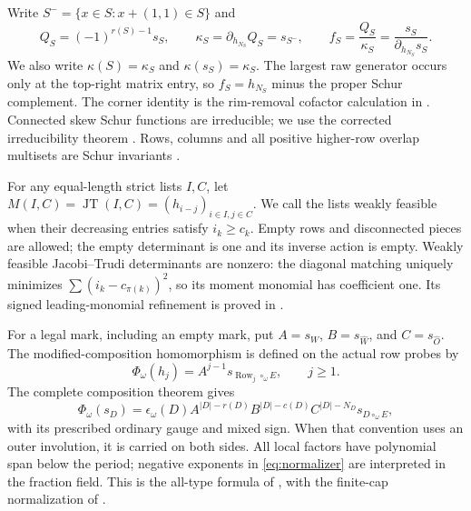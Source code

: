 \documentclass[11pt,a4paper]{amsart}
\numberwithin{equation}{section}
\theoremstyle{plain}
\theoremstyle{definition}
\newcommand{\Row}{\operatorname{Row}}
\newcommand{\JT}{\operatorname{JT}}
\begin{document}
Write \(S^- =\{x\in S:x+(1,1)\in S\}\) and
\[
 Q_S=(-1)^{r(S)-1}s_S,\qquad
 \kappa_S=\partial_{h_{N_S}}Q_S=s_{S^-},\qquad
 f_S=\frac{Q_S}{\kappa_S}=\frac{s_S}{\partial_{h_{N_S}}s_S}.
\]
We also write \(\kappa(S)=\kappa_S\) and \(\kappa(s_S)=\kappa_S\).  The largest raw generator occurs only at the top-right matrix entry, so
\(f_S=h_{N_S}\) minus the proper Schur complement.  The corner identity is the
rim-removal cofactor calculation in
\cite{Barekat2009CoincidencesCorrigendum,Reiner2007Coincidences}.
Connected skew Schur functions are irreducible; we use the corrected
irreducibility theorem \cite{Barekat2009CoincidencesCorrigendum}.
Rows, columns and all positive higher-row overlap multisets are Schur
invariants \cite[Cor.~8.11]{Reiner2007Coincidences}.

For any equal-length strict lists \(I,C\), let
\(M(I,C)=\JT(I,C)=(h_{i-j})_{i\in I,j\in C}\).
We call the lists weakly feasible when their decreasing entries satisfy
\(i_k\ge c_k\).  Empty rows and disconnected pieces are allowed; the empty
determinant is one and its inverse action is empty.  Weakly feasible
Jacobi--Trudi determinants are nonzero: the diagonal matching uniquely
minimizes \(\sum(i_k-c_{\pi(k)})^2\), so its moment monomial has coefficient one.
Its signed leading-monomial refinement is proved in .

For a legal mark, including an empty mark, put \(A=s_W\), \(B=s_{\widehat W}\),
and \(C=s_{\widehat O}\).  The modified-composition homomorphism is defined
on the actual row probes by
\begin{equation}\label{eq:phi}
 \Phi_\omega(h_j)=A^{j-1}s_{\Row_j\circ_\omega E},\qquad j\ge1.
\end{equation}
The complete composition theorem gives
\begin{equation}\label{eq:normalizer}
 \Phi_\omega(s_D)=\epsilon_\omega(D)
 A^{|D|-r(D)}B^{|D|-c(D)}C^{|D|-N_D}s_{D\circ_\omega E},
\end{equation}
with its prescribed ordinary gauge and mixed sign.  When that convention uses
an outer involution, it is carried on both sides.  All local factors have
polynomial span below the period; negative exponents in
\eqref{eq:normalizer} are interpreted in the fraction field.
This is the all-type formula of \cite{OlsonHarris2024HopfApplications}, with
the finite-cap normalization of \cite{Shields2026CornerDescent}.
\end{document}

